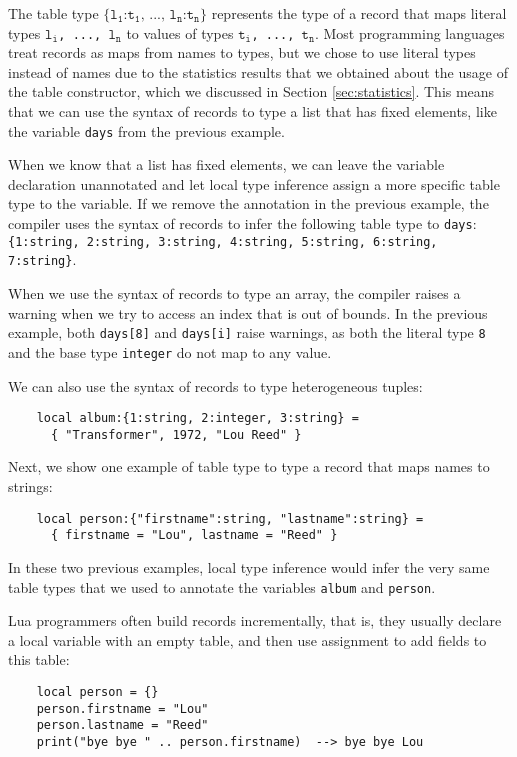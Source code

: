 The table type
$\texttt{\{l}{_\texttt{1}}\texttt{:t}_{\texttt{1}}
\texttt{, ..., l}{_\texttt{n}}\texttt{:t}_{\texttt{n}}\texttt{\}}$
represents the type of a record that maps literal types
$\texttt{l}_{\texttt{i}}$\texttt{, ..., }$\texttt{l}_{\texttt{n}}$
to values of types $\texttt{t}_{\texttt{i}}$\texttt{, ..., }$\texttt{t}_{\texttt{n}}$.
Most programming languages treat records as maps from names
to types, but we chose to use literal types instead of
names due to the statistics results that we obtained about
the usage of the table constructor, which we discussed in
Section \ref{sec:statistics}.
This means that we can use the syntax of records to type a
list that has fixed elements, like the variable \texttt{days} from
the previous example.

When we know that a list has fixed elements, we can leave the
variable declaration unannotated and let local type inference assign
a more specific table type to the variable.
If we remove the annotation in the previous example, the compiler uses the
syntax of records to infer the following table type to \texttt{days}:
\texttt{\{1:string, 2:string, 3:string, 4:string, 5:string, 6:string, 7:string\}}.

When we use the syntax of records to type an array, the compiler
raises a warning when we try to access an index that is out of bounds.
In the previous example, both \texttt{days[8]} and \texttt{days[i]}
raise warnings, as both the literal type \texttt{8} and the base type
\texttt{integer} do not map to any value.

We can also use the syntax of records to type heterogeneous tuples:
\begin{verbatim}
    local album:{1:string, 2:integer, 3:string} =
      { "Transformer", 1972, "Lou Reed" }
\end{verbatim}

Next, we show one example of table type to type a record that maps
names to strings:
\begin{verbatim}
    local person:{"firstname":string, "lastname":string} =
      { firstname = "Lou", lastname = "Reed" } 
\end{verbatim}

In these two previous examples, local type inference would infer the
very same table types that we used to annotate the variables
\texttt{album} and \texttt{person}.

Lua programmers often build records incrementally, that is,
they usually declare a local variable with an empty table,
and then use assignment to add fields to this table:
\begin{verbatim}
    local person = {}
    person.firstname = "Lou"
    person.lastname = "Reed"
    print("bye bye " .. person.firstname)  --> bye bye Lou
\end{verbatim}

